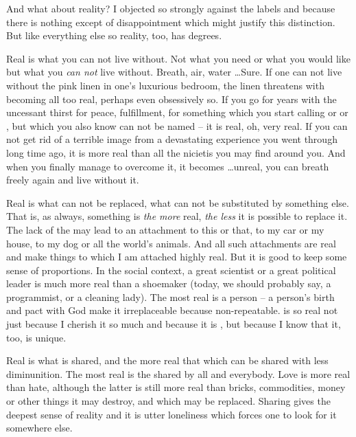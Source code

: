 


\pa
And what about reality? I objected so strongly against the labels 
 and  because there is nothing except 
 of disappointment which might justify this 
distinction. But like everything else so reality, too, has degrees. 

Real is what you can not live without.  Not what you need or what you
would like but what you {\em can not} live without.  Breath, air,
water \ldots Sure. 
If one can not live without the pink linen in one's luxurious bedroom, 
the linen threatens with becoming all too real, perhaps even obsessively so. 
If you go for years with the uncessant thirst
for peace, fulfillment, for something which you start calling
 or  or , but which you also know
can not be named -- it is real, oh, very real.  If you can not get rid
of a terrible image from a devastating experience you went through
long time ago, it is more real than all the nicietis you may find
around you.  And when you finally manage to overcome it, it becomes
\ldots unreal, you can breath freely again and live without it.


Real is what can not be replaced, what can not be substituted by
something else.  That is, as always, something is {\em the more} real,
{\em the less} it is possible to replace it.  The lack of the
 may lead to an attachment to this or that, to
my car or my house, to my dog or all the world's animals.  And all
such attachments are real and make things to which I am attached highly
real.  But it is good to keep some sense of proportions.  In the
social context, a great scientist or a great political leader is much
more real than a shoemaker (today, we should probably say, a
programmist, or a cleaning lady).  The most real is a person -- a 
person's birth and pact with God make it irreplaceable because
non-repeatable.   is so real not just because I
cherish it so much and because it is , but because I know 
that it, too, is unique.

Real is what is shared, and the more real that which can be shared
with less diminunition.  The most real is the  shared by
all and everybody.  Love is more real than hate, although the latter
is still more real than bricks, commodities, money or other things it
may destroy, and which may be replaced.  Sharing gives the deepest
sense of reality and it is utter loneliness which forces one to look
for it somewhere else.

